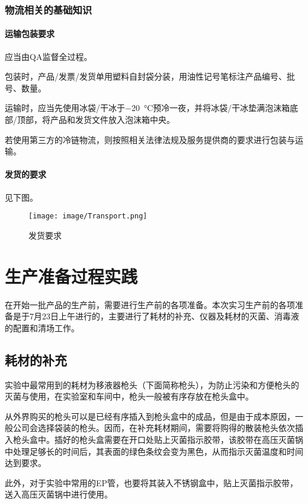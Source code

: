 \subsubsection{物流相关的基础知识}

\paragraph{运输包装要求} 应当由QA监督全过程。

包装时，产品/发票/发货单用塑料自封袋分装，用油性记号笔标注产品编号、批号、数量。

运输时，应当先使用冰袋/干冰­于\SI{-20}{\celsius}预冷一夜，并将冰袋/干冰垫满泡沫箱底部/顶部，将产品和发货文件放入泡沫箱中央。

若使用第三方的冷链物流，则按照相关法律法规及服务提供商的要求进行包装与运输。

\paragraph{发货的要求} 见下图。

\begin{figure}[H]
    \centering
    \texttt{[image: image/Transport.png]}
    \caption{发货要求}
    \label{TR}
\end{figure}

\section{生产准备过程实践}

在开始一批产品的生产前，需要进行生产前的各项准备。本次实习生产前的各项准备是于7月23日上午进行的，主要进行了耗材的补充、仪器及耗材的灭菌、消毒液的配置和清场工作。

\subsection{耗材的补充}
实验中最常用到的耗材为移液器枪头（下面简称枪头），为防止污染和方便枪头的灭菌与使用，在实验室和车间中，枪头一般被有序存放在枪头盒中。

从外界购买的枪头可以是已经有序插入到枪头盒中的成品，但是由于成本原因，一般公司会选择袋装的枪头。因而，在补充耗材期间，需要将购得的散装枪头依次插入枪头盒中。插好的枪头盒需要在开口处贴上灭菌指示胶带，该胶带在高压灭菌锅中处理足够长的时间后，其表面的绿色条纹会变为黑色，从而指示灭菌温度和时间达到要求。

此外，对于实验中常用的EP管，也要将其装入不锈钢盒中，贴上灭菌指示胶带，送入高压灭菌锅中进行使用。

